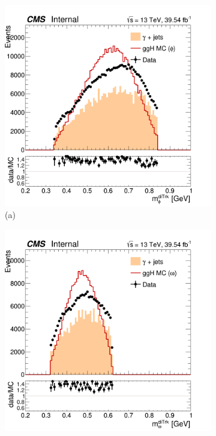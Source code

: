 \begin{figure}[!ht]
    \captionsetup[subfigure]{labelformat=empty}
    \vspace*{-0.2cm}
    \centering
    \setlength{\mylength}{\textwidth}
    \begin{subfigure}[t]{0.50\mylength}
        \centering
        \includegraphics[width=0.45\mylength]{resources/plots/Phi3_ditrk_mass.png}
        \caption{\footnotesize (a)}
    \end{subfigure}%
    \begin{subfigure}[t]{0.50\mylength}
        \centering
        \includegraphics[width=0.45\mylength]{resources/plots/Omega_ditrk_mass.png}

\end{subfigure}
\end{figure}
